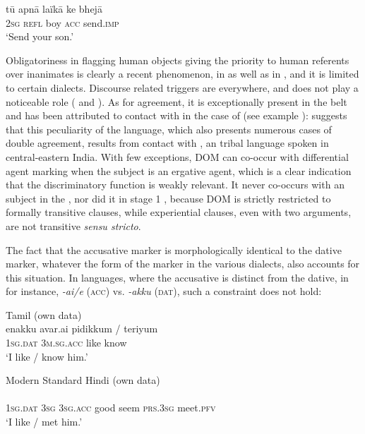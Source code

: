 \documentclass[output=paper]{LSP/langsci}
\begin{document}
\ex  \label{10-mo-ex:55b}

\gll tū apnā laïkā ke bhejā\\
\textsc{2sg} \textsc{refl} boy \textsc{acc} send.\textsc{imp}\\
\glt ‘Send your son.’ 
\z
\z

Obligatoriness in flagging human objects giving the priority to human referents over inanimates is clearly a recent phenomenon, in  as well as in , and it is limited to certain dialects. Discourse related triggers are  everywhere, and  does not play a noticeable role (\cf {} and ). As for agreement, it is exceptionally present in the  belt and has been attributed to contact with in the case of  (see example ): \citet{Verma1991Exploring} suggests that this peculiarity of the language, which also presents numerous cases of double agreement, results from contact with , an  tribal language spoken in central-eastern India. With few exceptions, DOM can co-occur with differential agent marking when the subject is an ergative agent, which is a clear indication that the discriminatory function is weakly relevant. It never co-occurs with an  subject in the , nor did it in stage 1 , because DOM is strictly restricted to formally transitive clauses, while experiential clauses, even with two arguments, are not transitive \textit{sensu stricto}. 

The fact that the accusative marker is morphologically identical to the dative marker, whatever the form of the marker in the various dialects, also accounts for this situation. In  languages, where the accusative is distinct from the dative, in  for instance, \textit{-ai/e} (\textsc{acc}) vs. \textit{-akku} (\textsc{dat}), such a constraint does not hold:

\ea Tamil (own data)\label{10-mo-ex:56a}\\
\gll enakku avar.ai pidikkum / teriyum\\
\textsc{1sg.dat} \textsc{3m.sg.acc} like { } know\\
\glt ‘I like / know him.’
\z

\ea Modern Standard Hindi (own data)\label{10-mo-ex:56b}\\
\\
\textsc{1sg.dat} \textsc{3sg} \textsc{3sg.acc} good seem \textsc{prs.3sg} { } meet.\textsc{pfv}\\
\glt ‘I like / met him.’ 
\z
\end{document}
